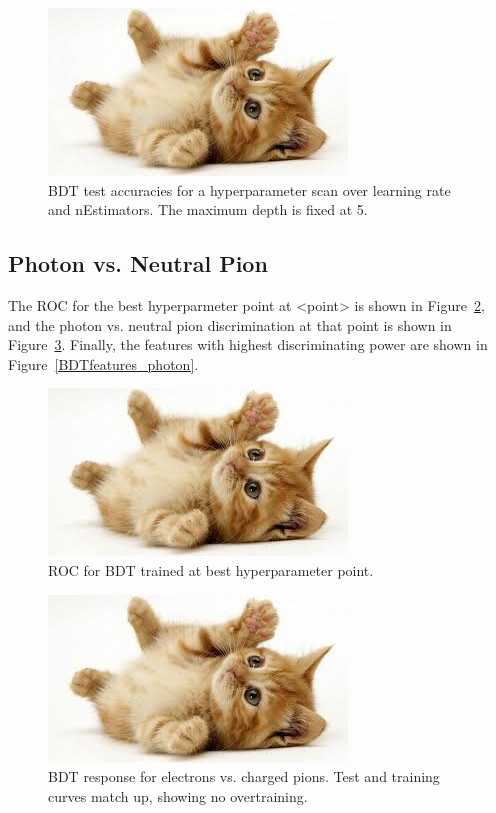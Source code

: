 \documentclass{article}
\begin{document}
    \begin{figure}
        \begin{center}
            \includegraphics{images/cat-thumb.jpeg}
        \end{center}
        \caption{BDT test accuracies for a hyperparameter scan over learning rate and nEstimators. The maximum depth is fixed at 5.}
        \label{BDTscan2}
    \end{figure}

    \subsection*{Photon vs. Neutral Pion}

    The ROC for the best hyperparmeter point at <point> is shown in Figure~\ref{BDTROC_photon}, and the photon vs. neutral pion discrimination at that point is shown in Figure~\ref{BDTdiscrimination_photon}. Finally, the features with highest discriminating power are shown in Figure~\ref{BDTfeatures_photon}.

    \begin{figure}
        \begin{center}
            \includegraphics{images/cat-thumb.jpeg}
        \end{center}
        \caption{ROC for BDT trained at best hyperparameter point.}
        \label{BDTROC_photon}
    \end{figure}

    \begin{figure}
        \begin{center}
            \includegraphics{images/cat-thumb.jpeg}
        \end{center}
        \caption{BDT response for electrons vs. charged pions. Test and training curves match up, showing no overtraining.}
        \label{BDTdiscrimination_photon}
    \end{figure}
\end{document}
